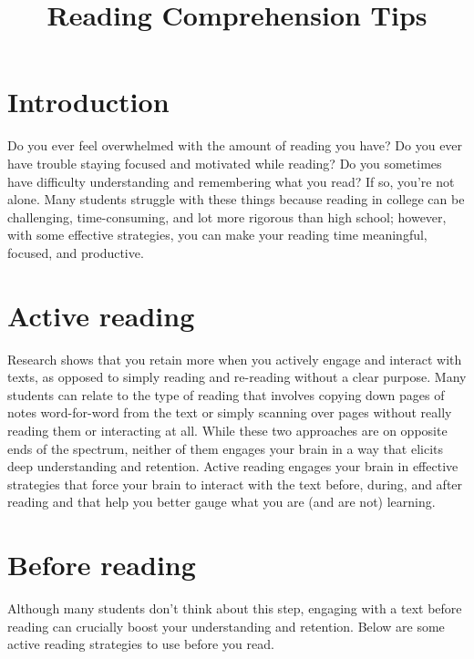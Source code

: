 \documentclass[../main.tex]{subfiles}
\title{Reading Comprehension Tips}
\begin{document}
\maketitle
%
\section{Introduction}
Do you ever feel overwhelmed with the amount of reading you have? Do you ever
have trouble staying focused and motivated while reading? Do you sometimes have
difficulty understanding and remembering what you read? If so, you're not alone.
Many students struggle with these things because reading in college can be
challenging, time-consuming, and lot more rigorous than high school; however,
with some effective strategies, you can make your reading time meaningful,
focused, and productive.
%
\section{Active reading}
Research shows that you retain more when you actively engage and interact with
texts, as opposed to simply reading and re-reading without a clear purpose. Many
students can relate to the type of reading that involves copying down pages of
notes word-for-word from the text or simply scanning over pages without really
reading them or interacting at all. While these two approaches are on opposite
ends of the spectrum, neither of them engages your brain in a way that elicits
deep understanding and retention. Active reading engages your brain in effective
strategies that force your brain to interact with the text before, during, and
after reading and that help you better gauge what you are (and are not)
learning.
%
\section{Before reading}
Although many students don't think about this step, engaging with a text before
reading can crucially boost your understanding and retention. Below are some
active reading strategies to use before you read.
\\
\end{document}
